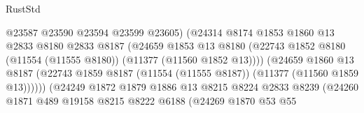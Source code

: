 \begin{lexlean}{RustStd}
\begin{coremodule}
                                          @23587
                                          @23590
                                          @23594
                                          @23599
                                          @23605)
                                        (@24314
                                          @8174
                                          @1853
                                          @1860
                                          @13
                                          @2833
                                          @8180
                                          @2833
                                          @8187
                                          (@24659
                                            @1853
                                            @13
                                            @8180
                                            (@22743
                                              @1852
                                              @8180
                                              (@11554 (@11555 @8180))
                                              (@11377 (@11560 @1852 @13))))
                                          (@24659
                                            @1860
                                            @13
                                            @8187
                                            (@22743
                                              @1859
                                              @8187
                                              (@11554 (@11555 @8187))
                                              (@11377 (@11560 @1859 @13))))))
                                      (@24249
                                        @1872
                                        @1879
                                        @1886
                                        @13
                                        @8215
                                        @8224
                                        @2833
                                        @8239
                                        (@24260
                                          @1871
                                          @489
                                          @19158
                                          @8215
                                          @8222
                                          @6188
                                          (@24269
                                            @1870
                                            @53
                                            @55

\end{coremodule}
\end{lexlean}
